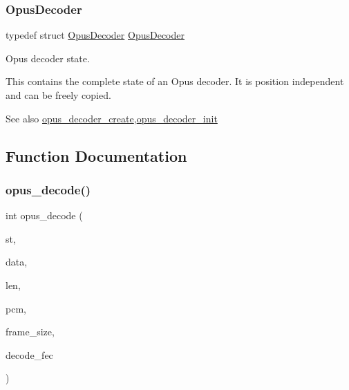 \subsubsection{\texorpdfstring{Opus\+Decoder}{OpusDecoder}}
{\footnotesize\ttfamily typedef struct \hyperlink{group__opus__decoder_ga401d8579958d36094715a6b90cd159a6}{Opus\+Decoder} \hyperlink{group__opus__decoder_ga401d8579958d36094715a6b90cd159a6}{Opus\+Decoder}}



Opus decoder state. 

This contains the complete state of an Opus decoder. It is position independent and can be freely copied. \begin{DoxySeeAlso}{See also}
\hyperlink{group__opus__decoder_ga753f6fe0b699c81cfd47d70c8e15a0bd}{opus\+\_\+decoder\+\_\+create},\hyperlink{group__opus__decoder_ga939156d1f561c4273d5c62fa9c235a01}{opus\+\_\+decoder\+\_\+init} 
\end{DoxySeeAlso}


\subsection{Function Documentation}
\mbox{\label{group__opus__decoder_ga7d1111f64c36027ddcb81799df9b3fc9}} 
\subsubsection{\texorpdfstring{opus\+\_\+decode()}{opus\_decode()}}
{\footnotesize\ttfamily int opus\+\_\+decode (\begin{DoxyParamCaption}\item[{\hyperlink{group__opus__decoder_ga401d8579958d36094715a6b90cd159a6}{Opus\+Decoder} $\ast$}]{st,  }\item[{const unsigned char $\ast$}]{data,  }\item[{\hyperlink{opus__types_8h_aa4d309d6f80b99dbabebc8f98879ab9a}{opus\+\_\+int32}}]{len,  }\item[{\hyperlink{opus__types_8h_acc9ed7cf60479eb81f9648c6ec27dc26}{opus\+\_\+int16} $\ast$}]{pcm,  }\item[{int}]{frame\+\_\+size,  }\item[{int}]{decode\+\_\+fec }\end{DoxyParamCaption})}



